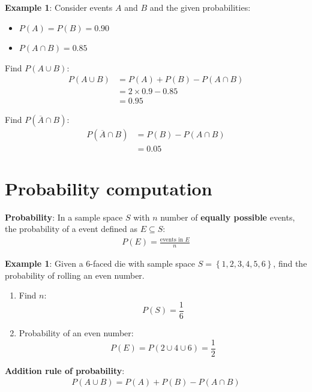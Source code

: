 \documentclass[10pt,a4paper]{article}
\begin{document}
\textbf{Example 1}: Consider events $A$ and $B$ and the given probabilities:
\begin{itemize}
    \item $P(A)=P(B)=0.90$
    \item $P(A\cap B)=0.85$
\end{itemize}

Find $P(A \cup B)$:
\begin{align*}
    P(A \cup B) &= P(A)+P(B) - P(A\cap B) \\
    &= 2 \times 0.9 - 0.85 \\
    &= 0.95
\end{align*}

Find $P(\overline{A}\cap B)$:
\begin{align*}
    P(\overline{A}\cap B) &= P(B)-P(A\cap B)\\
    &= 0.05
\end{align*}

\section{Probability computation}

\begin{tcolorbox}[breakable,colback=white]
\textbf{Probability}: In a sample space $S$ with $n$ number of \textbf{equally possible}
events, the probability of a event defined as $E \subseteq S$:
\begin{align*}
    P(E) = \frac{\text{events in }E}{n}
\end{align*}
\end{tcolorbox}

\textbf{Example 1}: Given a 6-faced die with sample space $S = \left\{1,2,3,4,5,6\right\}$, find the
probability of rolling an even number.
\begin{enumerate}
    \item Find $n$:
    $$
        P(S)=\frac{1}{6}
    $$

    \item Probability of an even number:
    $$
        P(E) = P(2 \cup 4 \cup 6) = \frac{1}{2}
    $$
\end{enumerate}

\textbf{Addition rule of probability}: 
\begin{align*}
    P(A\cup B) = P(A) + P(B)-P(A\cap B)
\end{align*}
\end{document}
